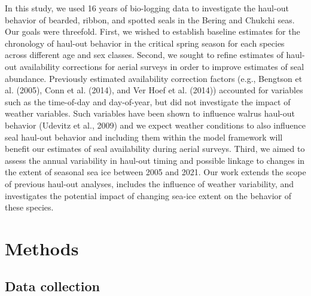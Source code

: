 \documentclass[fleqn,10pt,lineno]{wlpeerj} %
\begin{document}
In this study, we used 16 years of bio-logging data to investigate the haul-out
behavior of bearded, ribbon, and spotted seals in the Bering and Chukchi seas.
Our goals were threefold. First, we wished to establish baseline estimates for
the chronology of haul-out behavior in the critical spring season for each
species across different age and sex classes. Second, we sought to refine
estimates of haul-out availability corrections for aerial surveys in order to
improve estimates of seal abundance. Previously estimated availability
correction factors (e.g., Bengtson et al. (2005), Conn et al. (2014), and Ver Hoef et al. (2014))
accounted for variables such as the time-of-day and day-of-year, but did not
investigate the impact of weather variables. Such variables have been
shown to influence walrus haul-out behavior (Udevitz et al., 2009) and we expect weather
conditions to also influence seal haul-out behavior and including them within
the model framework will benefit our estimates of seal availability during
aerial surveys. Third, we aimed to assess the annual variability in haul-out
timing and possible linkage to changes in the extent of seasonal sea ice between
2005 and 2021. Our work extends the scope of previous haul-out analyses,
includes the influence of weather variability, and investigates the
potential impact of changing sea-ice extent on the behavior of these species.

\section*{Methods}\label{methods}

\subsection*{Data collection}\label{data-collection}
\end{document}
